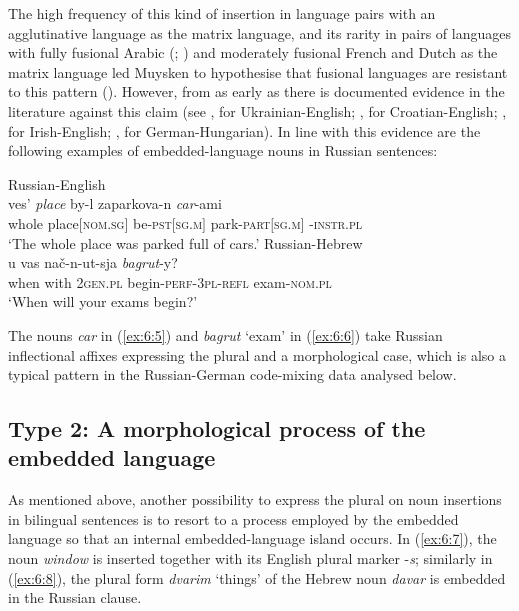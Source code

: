 \noindent The high frequency of this kind of insertion in language pairs with an agglutinative language as the matrix language, and its rarity in pairs of languages with fully fusional Arabic (\citealt[180]{boumans-syntax-1998}; \citealt[189]{nortier90}) and moderately fusional French and Dutch as the matrix language \citep{treffers-daller-mixing-1994} led Muysken to hypothesise that fusional languages are resistant to this pattern (\citeyear[77]{muysken-bilingual-2000}). However, from as early as \citet[265--266]{hasselmo72} there is documented evidence in the literature against this claim (see \citealt[174]{budzhak-jones98}, for Ukrainian-English; \citealt[73]{hlavac-second-generation-2003}, for Croatian-English; \citealt[180]{stenson-1990}, for Irish-English; \citealt[352]{szabo-language-2010}, for German-Hungarian). In line with this evidence are the following examples of embedded-language nouns in Russian sentences:

\ea
\label{ex:6:5}
Russian-English \citep[173]{benson}\\
\gll ves' \textit{place} by-l zaparkova-n \textit{car}-ami\\
	whole place$[$\textsc{nom.sg}$]$ be-\textsc{pst}$[$\textsc{sg.m}$]$ park-\textsc{part$[$sg.m$]$} \phantom{mn}-\textsc{instr.pl}\\
\glt `The whole place was parked full of cars.'
\ex
\label{ex:6:6}
Russian-Hebrew \citep[48]{naiditch08}\\
 {u} {vas} {nač-n-ut-sja} \textit{bagrut}-y?\\
	when with \textsc{2gen.pl} begin-\textsc{perf-3pl-refl} exam-\textsc{nom.pl}\\
\glt `When will your exams begin?'
\z

\noindent The nouns \textit{car} in (\ref{ex:6:5}) and \textit{bagrut} `exam' in (\ref{ex:6:6}) take Russian inflectional affixes expressing the plural and a morphological case, which is also a typical pattern in the Russian-German code-mixing data analysed below.

\subsection{Type 2: A morphological process of the embedded language}

As mentioned above, another possibility to express the plural on noun insertions in bilingual sentences is to resort to a process employed by the embedded language so that an internal embedded-language island occurs. In (\ref{ex:6:7}), the noun \textit{window} is inserted together with its English plural marker -\textit{s}; similarly in (\ref{ex:6:8}), the plural form \textit{dvarim} `things' of the Hebrew noun \textit{davar} is embedded in the Russian clause.

